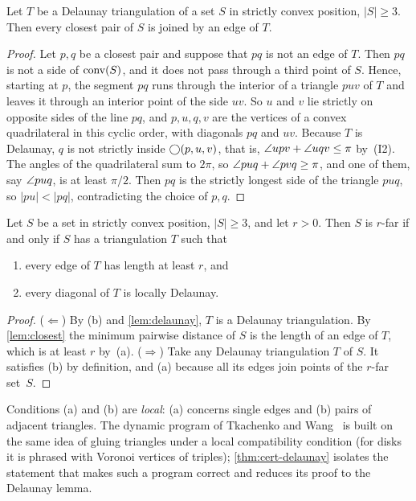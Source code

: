 \begin{lemma}\label{lem:closest}
Let $T$ be a Delaunay triangulation of a set $S$ in strictly convex position,
$|S|\ge3$. Then every closest pair of $S$ is joined by an edge of $T$.
\end{lemma}
\begin{proof}
Let $p,q$ be a closest pair and suppose that $pq$ is not an edge of $T$. Then
$pq$ is not a side of $\mathrm{conv}(S)$, and it does not pass through a third point
of $S$. Hence, starting at $p$, the segment $pq$ runs through the interior of
a triangle $puv$ of $T$ and leaves it through an interior point of the side
$uv$. So $u$ and $v$ lie strictly on opposite sides of the line $pq$, and
$p,u,q,v$ are the vertices of a convex quadrilateral in this cyclic order,
with diagonals $pq$ and $uv$. Because $T$ is Delaunay, $q$ is not strictly
inside $\bigcirc(p,u,v)$, that is, $\angle upv+\angle uqv\le\pi$ by~(I2). The
angles of the quadrilateral sum to $2\pi$, so $\angle puq+\angle pvq\ge\pi$, and
one of them, say $\angle puq$, is at least $\pi/2$. Then $pq$ is the strictly
longest side of the triangle $puq$, so $|pu|<|pq|$, contradicting the choice
of $p,q$.
\end{proof}

\begin{theorem}\label{thm:cert-delaunay}
Let $S$ be a set in strictly convex position, $|S|\ge3$, and let $r>0$. Then
$S$ is $r$-far if and only if $S$ has a triangulation $T$ such that
\begin{enumerate}[label=(\alph*),itemsep=0pt,topsep=2pt]
\item every edge of $T$ has length at least $r$, and
\item every diagonal of $T$ is locally Delaunay.
\end{enumerate}
\end{theorem}
\begin{proof}
($\Leftarrow$) By (b) and \cref{lem:delaunay}, $T$ is a Delaunay
triangulation. By \cref{lem:closest} the minimum pairwise distance of $S$ is
the length of an edge of $T$, which is at least $r$ by~(a).
($\Rightarrow$) Take any Delaunay triangulation $T$ of $S$. It satisfies (b)
by definition, and (a) because all its edges join points of the $r$-far
set~$S$.
\end{proof}

Conditions (a) and (b) are \emph{local}: (a) concerns single edges and (b)
pairs of adjacent triangles. The dynamic program of
Tkachenko and Wang~\citep{tw26} is built on the same idea of gluing triangles
under a local compatibility condition (for disks it is phrased with
Voronoi vertices of triples); \cref{thm:cert-delaunay} isolates the
statement that makes such a program correct and reduces its proof to the
Delaunay lemma.

